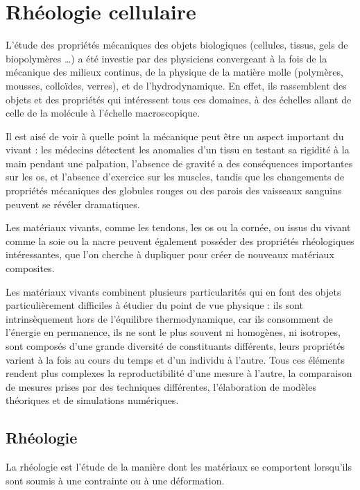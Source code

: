 \documentclass{report}
\begin{document}
\chapter{Rhéologie cellulaire}

L'étude des propriétés mécaniques des objets biologiques (cellules, tissus, gels de biopolymères \dots) a été investie par des physiciens convergeant à la fois de la mécanique des milieux continus, de la physique de la matière molle (polymères, mousses, colloïdes, verres), et de l'hydrodynamique. 
En effet, ils rassemblent des objets et des propriétés qui intéressent tous ces domaines, à des échelles allant de celle de la molécule à l'échelle macroscopique. 

Il est aisé de voir à quelle point la mécanique peut être un aspect important du vivant : les médecins détectent les anomalies d'un tissu en testant sa rigidité \og à la main \fg pendant une palpation, l'absence de gravité a des conséquences importantes sur les os, et l'absence d'exercice sur les muscles, tandis que les changements de propriétés mécaniques des globules rouges ou des parois des vaisseaux sanguins peuvent se révéler dramatiques. 

Les matériaux vivants, comme les tendons, les os ou la cornée, ou issus du vivant comme la soie ou la nacre peuvent également posséder des propriétés rhéologiques intéressantes, que l'on cherche à dupliquer pour créer de nouveaux matériaux composites. 

Les matériaux vivants combinent plusieurs particularités qui en font des objets particulièrement difficiles à étudier du point de vue physique : ils sont intrinsèquement hors de l'équilibre thermodynamique, car ils consomment de l'énergie en permanence, ils ne sont le plus souvent ni homogènes, ni isotropes, sont composés d'une grande diversité de constituants différents, leurs propriétés varient à la fois au cours du temps et d'un individu à l'autre. 
Tous ces éléments rendent plus complexes la reproductibilité d'une mesure à l'autre, la comparaison de mesures prises par des techniques différentes, l'élaboration de modèles théoriques et de simulations numériques.


\section{Rhéologie}

La rhéologie est l'étude de la manière dont les matériaux se comportent lorsqu'ils sont soumis à une contrainte ou à une déformation. 
\end{document}
